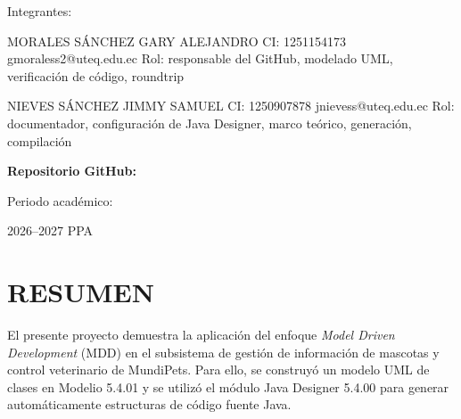 \documentclass[10pt,a4paper,openany]{report}
\begin{document}
\begin{titlepage}
\begin{center}
			
			\vspace{0.6cm}
			
			
			Integrantes:
			
			\vspace{0.2cm}
			
			
			MORALES SÁNCHEZ GARY ALEJANDRO	CI: 1251154173 gmoraless2@uteq.edu.ec Rol: responsable del GitHub, modelado UML, verificación de código, roundtrip
			
			\vspace{0.2cm}
			
			
			NIEVES SÁNCHEZ JIMMY SAMUEL	CI: 1250907878 jnievess@uteq.edu.ec Rol: documentador, configuración de Java Designer, marco teórico,
			generación, compilación
			
			\vfill
			\vspace{0.6cm}
			
			\textbf{Repositorio GitHub:}
			
			\vspace{0.2cm}
			
			
			\vfill
			
			Periodo académico:
			
			2026--2027 PPA
			
		\end{center}
		
	\end{titlepage}
	
	
	
	\setcounter{tocdepth}{0}
	{\small\tableofcontents}
	
	
	\newpage
	
	
	
	
	
	
	\chapter*{RESUMEN}
	
	El presente proyecto demuestra la aplicación del enfoque
	\textit{Model Driven Development} (MDD) en el subsistema de gestión de
	información de mascotas y control veterinario de MundiPets. Para ello,
	se construyó un modelo UML de clases en Modelio 5.4.01 y se utilizó el
	módulo Java Designer 5.4.00 para generar automáticamente estructuras de
	código fuente Java.
	
\end{document}
